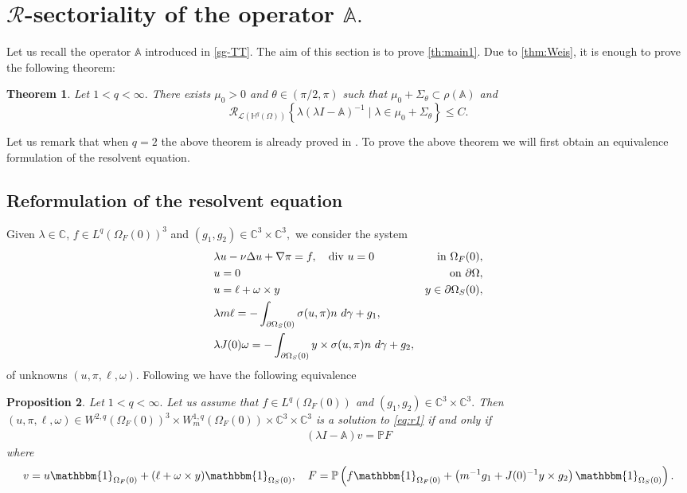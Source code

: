 \documentclass[12pt,a4paper,reqno]{amsart}
\newtheorem{theorem}{Theorem}[section]
\newtheorem{proposition}[theorem]{Proposition}
\theoremstyle{definition}
\theoremstyle{remark}
\numberwithin{equation}{section}
\newcommand{\oso}{\Omega_{S}(0)}
\newcommand{\ofo}{\Omega_{F}(0)}
\newcommand{\ct}{\mathbb{C}^{3}}
\newcommand{\poso}{\partial\oso}
\newcommand{\mr}{\mathcal{R}}
\begin{document}
\section{$\mr$-sectoriality of the operator $\mathbb{A}.$} \label{sec:RA}
Let us recall the operator $\mathbb{A}$ introduced in \eqref{sg-TT}. The aim of this section is to prove \cref{th:main1}.  Due to \cref{thm:Weis}, it is enough to prove the following theorem:

\begin{theorem} \label{th:31}
Let $1 < q < \infty.$ There exists $\mu_{0} > 0$ and $\theta \in (\pi/2,\pi)$ such that $\mu_{0} + \Sigma_{\theta}\subset \rho(\mathbb{A})$ and
\begin{equation}
\mr_{\mathcal{L}(\mathbb{H}^{q}(\Omega))}  \left\{ \lambda (\lambda I - \mathbb{A})^{-1} \mid \lambda \in \mu_{0} + \Sigma_{\theta} \right\}  \leqslant C.
\end{equation}
\end{theorem}
Let us remark that when $q =2$ the above theorem is already proved in \cite{TT1}. To prove the above theorem we will first obtain an equivalence  formulation of the resolvent equation.

\subsection{Reformulation of the resolvent equation}
Given $\lambda\in \mathbb{C}$,  $f \in L^{q}(\ofo)^{3}$ and $(g_{1},g_{2}) \in \ct \times \ct,$ we consider the system
\begin{alignat}{2} \label{eq:r1}
&\lambda u - \nu \Delta u + \nabla \pi  = f, \quad \mathrm{div} \ u = 0  &  \mbox{ in }   \ofo, \notag \\
& u = 0   & \mbox{ on }  \partial\Omega,\notag  \\
&  u  = \ell  + \omega \times y &   y \in   \poso, \notag \\
&  \lambda  m \ell =  -  \int_{\partial \Omega_{S}(0)}  \sigma(u,\pi) n \ d\gamma  +  g_{1}, \\
&  \lambda J(0) \omega =  - \int_{\partial \Omega_{S}(0)} y \times   \sigma(u,\pi)n \ d\gamma + g_{2}, \notag
\end{alignat}
of unknowns $(u,\pi,\ell,\omega)$.
 Following \cite{TT2, TT1} we have the following equivalence

\begin{proposition} \label{prop:ev1}
Let $1 < q < \infty.$ Let us assume that $f \in L^{q}(\ofo)$ and $(g_{1},g_{2}) \in \ct \times \ct.$ Then $(u,\pi,\ell,\omega) \in W^{2,q}(\ofo)^{3} \times W^{1,q}_{m}(\ofo) \times \ct \times \ct$ is a solution to \eqref{eq:r1} if and only if
\begin{align}
(\lambda I - \mathbb{A}) v = \mathbb{P} F
\end{align}
where
\begin{align*}
v = u \mathbbm{1}_{\ofo} + (\ell + \omega \times y) \mathbbm{1}_{\oso}, \quad F = \mathbb{P} \left( f\mathbbm{1}_{\ofo} + \left(m^{-1} g_{1} + J(0)^{-1} y \times g_{2} \right)\mathbbm{1}_{\oso} \right).
\end{align*}
\end{proposition}
\end{document}
